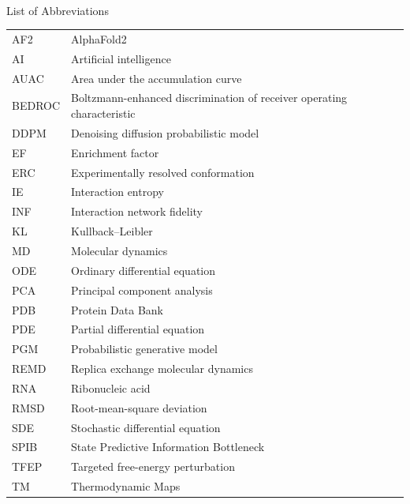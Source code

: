 {\singlespacing
\hbox{\ }
\vspace{0.5in}

\begin{center}
\large{List of Abbreviations}
\end{center}

\vspace{3pt}

\begin{supertabular}{ll}
AF2 & AlphaFold2 \\
AI & Artificial intelligence \\
AUAC & Area under the accumulation curve \\
BEDROC & Boltzmann-enhanced discrimination of receiver operating characteristic \\
DDPM & Denoising diffusion probabilistic model \\
EF & Enrichment factor \\
ERC & Experimentally resolved conformation \\
IE & Interaction entropy \\
INF & Interaction network fidelity \\
KL & Kullback--Leibler \\
MD & Molecular dynamics \\
ODE & Ordinary differential equation \\
PCA & Principal component analysis \\
PDB & Protein Data Bank \\
PDE & Partial differential equation \\
PGM & Probabilistic generative model \\
REMD & Replica exchange molecular dynamics \\
RNA & Ribonucleic acid \\
RMSD & Root-mean-square deviation \\
SDE & Stochastic differential equation \\
SPIB & State Predictive Information Bottleneck \\
TFEP & Targeted free-energy perturbation \\
TM & Thermodynamic Maps \\
\end{supertabular}
}
